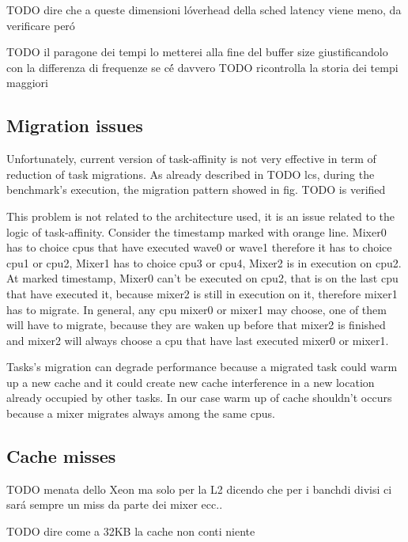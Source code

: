 TODO dire che a queste dimensioni l\'overhead della sched latency viene meno, da verificare per\'o

TODO il paragone dei tempi lo metterei alla fine del buffer size giustificandolo con la differenza di frequenze se c\'\'e davvero
TODO ricontrolla la storia dei tempi maggiori 


\subsection{Migration issues}

Unfortunately, current version of task-affinity is not very effective in term of reduction of task migrations. As already described in TODO lcs, during 
the benchmark's execution, the migration pattern showed in fig. TODO is verified

This problem is not related to the architecture used, it is an issue related to the logic of task-affinity. Consider the timestamp marked with orange line.
Mixer0 has to choice cpus that have executed wave0 or wave1 therefore it has to choice cpu1 or cpu2, Mixer1 has to choice cpu3 or cpu4, Mixer2 is in 
execution on cpu2. At marked timestamp, Mixer0 can't be executed on cpu2, that is on the last cpu that have executed it, because mixer2 is still in 
execution on it, therefore mixer1 has to migrate. In general, any cpu mixer0 or mixer1 may choose, one of them will have to migrate, because they are 
waken up before that mixer2 is finished and mixer2 will always choose a cpu that have last executed mixer0 or mixer1. 

Tasks's migration can degrade performance because a migrated task could warm up a new cache and it could create new cache interference in a new location 
already occupied by other tasks. In our case warm up of cache shouldn't occurs because a mixer migrates always among the same cpus.

\subsection{Cache misses}

TODO menata dello Xeon ma solo per la L2 dicendo che per i banchdi divisi ci sar\'a sempre un miss da parte dei mixer ecc..

TODO dire come a 32KB la cache non conti niente


